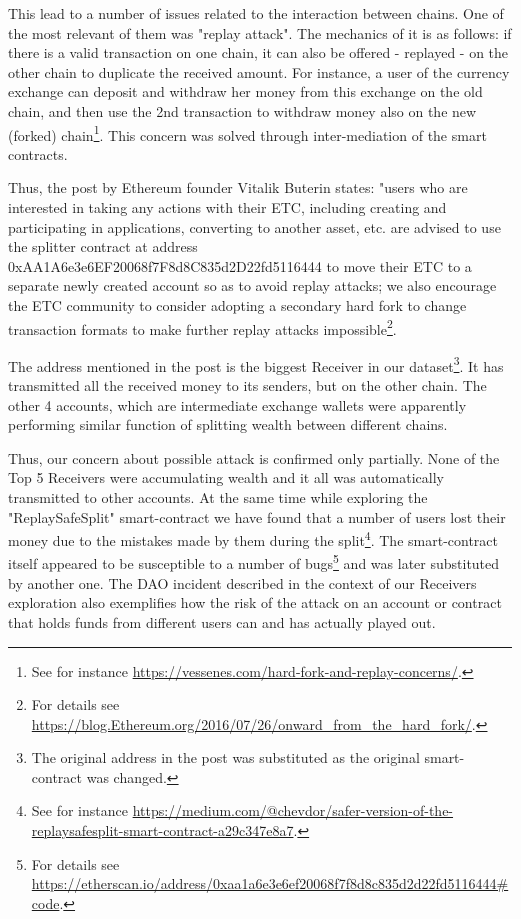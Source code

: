 This lead to a number of issues related to the interaction between chains.
One of the most relevant of them was "replay attack".
The mechanics of it is as follows:
if there is a valid transaction on one chain, it can also be offered - replayed - on the other chain to duplicate the received amount.
For instance, a user of the currency exchange can deposit and withdraw her money from this exchange on the old chain, and then use the 2nd transaction to withdraw money also on the new (forked) chain\footnote{See for instance \url{https://vessenes.com/hard-fork-and-replay-concerns/}.}.
This concern was solved through inter-mediation of the smart contracts.

Thus, the post by Ethereum founder Vitalik Buterin states:
"users who are interested in taking any actions with their ETC, including creating and participating in applications, converting to another asset, etc. are advised to use the splitter contract at address 0xAA1A6e3e6EF20068f7F8d8C835d2D22fd5116444 to move their ETC to a separate newly created account so as to avoid replay attacks; we also encourage the ETC community to consider adopting a secondary hard fork to change transaction formats to make further replay attacks impossible\footnote{For details see \url{https://blog.Ethereum.org/2016/07/26/onward\_from\_the\_hard\_fork/}.}.

The address mentioned in the post is the biggest Receiver in our dataset\footnote{The original address in the post was substituted as the original smart-contract was changed.}.
It has transmitted all the received money to its senders, but on the other chain.
The other 4 accounts, which are intermediate exchange wallets were apparently performing similar function of splitting wealth between different chains.

Thus, our concern about possible attack is confirmed only partially.
None of the Top 5 Receivers were accumulating wealth and it all was automatically transmitted to other accounts.
At the same time while exploring the "ReplaySafeSplit" smart-contract we have found that a number of users lost their money due to the mistakes made by them during the split\footnote{See for instance \url{https://medium.com/@chevdor/safer-version-of-the-replaysafesplit-smart-contract-a29c347e8a7}.}.
The smart-contract itself appeared to be susceptible to a number of bugs\footnote{For details see \url{https://etherscan.io/address/0xaa1a6e3e6ef20068f7f8d8c835d2d22fd5116444\#code}.} and was later substituted by another one.
The DAO incident described in the context of our Receivers exploration also exemplifies how the risk of the attack on an account or contract that holds funds from different users can and has actually played out.

